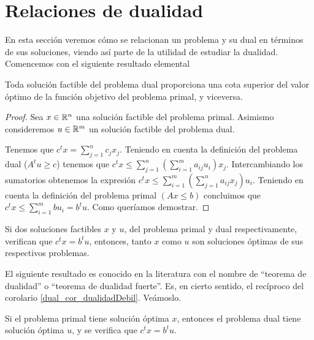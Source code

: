 \section{Relaciones de dualidad}
En esta sección veremos cómo se relacionan un problema y su dual en términos de sus soluciones, viendo así parte de la utilidad de estudiar la dualidad. Comencemos con el siguiente resultado elemental
\begin{lem}[Cotas]
	Toda solución factible del problema dual proporciona una cota superior del valor óptimo de la función objetivo del problema primal, y viceversa.
\end{lem}
\begin{proof}
	Sea $x\in\mathbb{R}^n$ una solución factible del problema primal. Asimismo consideremos $u\in\mathbb{R}^m$ un solución factible del problema dual.
	
	Tenemos que $c^tx=\sum_{j=1}^nc_jx_j$. Teniendo en cuenta la definición del problema dual ($A^tu\geq c$) tenemos que $c^tx\leq \sum_{j=1}^n(\sum_{i=1}^{m}a_{ij}u_i)x_j$. Intercambiando los sumatorios obtenemos la expresión $c^tx\leq\sum_{i=1}^{m}(\sum_{j=1}^{n}a_{ij}x_j)u_i$. Teniendo en cuenta la definición del problema primal $(Ax\leq b)$ concluimos que $c^tx\leq \sum_{i=1}^{m}bu_i=b^tu$. Como queríamos demostrar.
\end{proof}
\begin{cor}
	\label{dual_cor_dualidadDebil}
	Si dos soluciones factibles $x$ y $u$, del problema primal y dual respectivamente, verifican que $c^tx=b^tu$, entonces, tanto $x$ como $u$ son soluciones óptimas de sus respectivos problemas.
\end{cor}
El siguiente resultado es conocido en la literatura con el nombre de ``teorema de dualidad'' o ``teorema de dualidad fuerte''. Es, en cierto sentido, el recíproco del corolario \ref{dual_cor_dualidadDebil}. Veámoslo.
\begin{theo}
	\label{dual_teo_dualidadFuerte}
	Si el problema primal tiene solución óptima $x$, entonces el problema dual tiene solución óptima $u$, y se verifica que $c^tx=b^tu$.
\end{theo}
